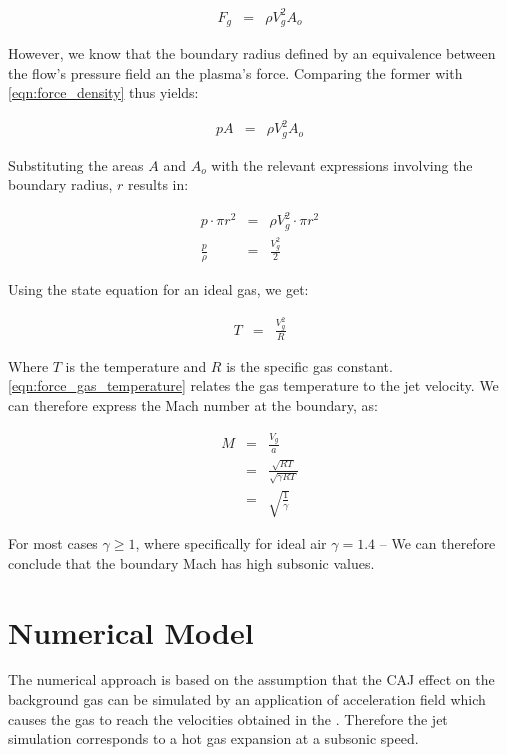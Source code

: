 \documentclass[a4paper]{iacas}%
\begin{document}
\begin{eqnarray}\label{eqn:force_density}
F_g &=& \rho V^2_g A_{o}
\end{eqnarray}

However, we know that the boundary radius defined by an equivalence between the flow's pressure field an the plasma's force. Comparing the former with 
\eqref{eqn:force_density} thus yields:

\begin{eqnarray}\label{eqn:force_gas_equal}
p A &=& \rho V^2_g A_{o}
\end{eqnarray}

Substituting the areas $A$ and $A_o$ with the relevant expressions involving the boundary radius, $r$ results in: 

\begin{eqnarray}\label{eqn:force_gas_ratio}
p \cdot \pi r^2 &=& \rho V^2_g \cdot \pi r^2 \\
\frac{p}{\rho} &=& \frac{V^2_g}{2}
\end{eqnarray}

Using the state equation for an ideal gas, we get:

\begin{eqnarray}\label{eqn:force_gas_temperature}
	T &=& \frac{V^2_g}{R}
\end{eqnarray}

Where $T$ is the temperature and $R$ is the specific gas constant. \eqref{eqn:force_gas_temperature} relates the gas temperature to the jet velocity. We can therefore express the Mach number at the boundary, as:

\begin{eqnarray}
	M &=& \frac{V_g}{a} \\
	 &=& \frac{\sqrt{RT}}{\sqrt{\gamma R T}}\\\label{eqn:mach}
	 &=& \sqrt{\frac{1}{\gamma}}
\end{eqnarray}

For most cases $\gamma \geq 1$, where specifically for ideal air $\gamma = 1.4$ -- We can therefore conclude that the boundary Mach has high subsonic values.

\section{Numerical Model}

The numerical approach is based on the assumption that the CAJ effect on the background gas can be simulated by an application of acceleration field which causes the gas to reach the velocities obtained in the \cite{KR}. Therefore the jet simulation corresponds to a hot gas expansion at a subsonic speed.
\end{document}
